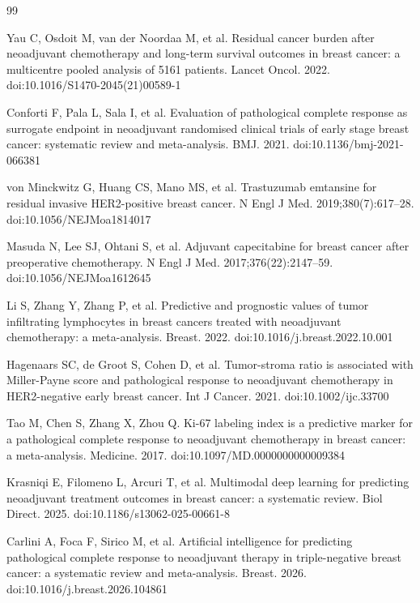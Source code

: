 \documentclass[10pt,a4paper,twocolumn]{article}
\begin{document}
\begin{thebibliography}{99}
\footnotesize\raggedright\setlength{\itemsep}{0pt}

 Yau C, Osdoit M, van der Noordaa M, et al. Residual cancer burden after neoadjuvant chemotherapy and long-term survival outcomes in breast cancer: a multicentre pooled analysis of 5161 patients. Lancet Oncol. 2022. doi:10.1016/S1470-2045(21)00589-1

 Conforti F, Pala L, Sala I, et al. Evaluation of pathological complete response as surrogate endpoint in neoadjuvant randomised clinical trials of early stage breast cancer: systematic review and meta-analysis. BMJ. 2021. doi:10.1136/bmj-2021-066381

 von Minckwitz G, Huang CS, Mano MS, et al. Trastuzumab emtansine for residual invasive HER2-positive breast cancer. N Engl J Med. 2019;380(7):617--28. doi:10.1056/NEJMoa1814017

 Masuda N, Lee SJ, Ohtani S, et al. Adjuvant capecitabine for breast cancer after preoperative chemotherapy. N Engl J Med. 2017;376(22):2147--59. doi:10.1056/NEJMoa1612645

 Li S, Zhang Y, Zhang P, et al. Predictive and prognostic values of tumor infiltrating lymphocytes in breast cancers treated with neoadjuvant chemotherapy: a meta-analysis. Breast. 2022. doi:10.1016/j.breast.2022.10.001

 Hagenaars SC, de Groot S, Cohen D, et al. Tumor-stroma ratio is associated with Miller-Payne score and pathological response to neoadjuvant chemotherapy in HER2-negative early breast cancer. Int J Cancer. 2021. doi:10.1002/ijc.33700

 Tao M, Chen S, Zhang X, Zhou Q. Ki-67 labeling index is a predictive marker for a pathological complete response to neoadjuvant chemotherapy in breast cancer: a meta-analysis. Medicine. 2017. doi:10.1097/MD.0000000000009384

 Krasniqi E, Filomeno L, Arcuri T, et al. Multimodal deep learning for predicting neoadjuvant treatment outcomes in breast cancer: a systematic review. Biol Direct. 2025. doi:10.1186/s13062-025-00661-8

 Carlini A, Foca F, Sirico M, et al. Artificial intelligence for predicting pathological complete response to neoadjuvant therapy in triple-negative breast cancer: a systematic review and meta-analysis. Breast. 2026. doi:10.1016/j.breast.2026.104861


\end{thebibliography}
\end{document}
